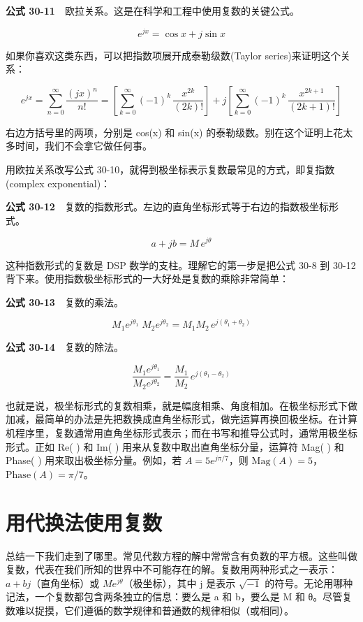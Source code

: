 \textbf{公式 30-11}　欧拉关系。这是在科学和工程中使用复数的关键公式。

\[e^{jx} = \cos x + j\sin x\]

如果你喜欢这类东西，可以把指数项展开成泰勒级数(Taylor
series)来证明这个关系：

\[e^{jx} = \sum_{n=0}^{\infty}\frac{(jx)^n}{n!} = \left[\sum_{k=0}^{\infty}(-1)^k\,\frac{x^{2k}}{(2k)!}\right] + j\left[\sum_{k=0}^{\infty}(-1)^k\,\frac{x^{2k+1}}{(2k+1)!}\right]\]

右边方括号里的两项，分别是 cos(x) 和 sin(x)
的泰勒级数。别在这个证明上花太多时间，我们不会拿它做任何事。

用欧拉关系改写公式
30-10，就得到极坐标表示复数最常见的方式，即复指数(complex exponential)：

\textbf{公式
30-12}　复数的指数形式。左边的直角坐标形式等于右边的指数极坐标形式。

\[a + jb = M\,e^{j\theta}\]

这种指数形式的复数是 DSP 数学的支柱。理解它的第一步是把公式 30-8 到
30-12 背下来。使用指数极坐标形式的一大好处是复数的乘除非常简单：

\textbf{公式 30-13}　复数的乘法。

\[M_1 e^{j\theta_1}\; M_2 e^{j\theta_2} = M_1 M_2\, e^{j(\theta_1+\theta_2)}\]

\textbf{公式 30-14}　复数的除法。

\[\frac{M_1 e^{j\theta_1}}{M_2 e^{j\theta_2}} = \frac{M_1}{M_2}\, e^{j(\theta_1-\theta_2)}\]

也就是说，极坐标形式的复数相乘，就是幅度相乘、角度相加。在极坐标形式下做加减，最简单的办法是先把数换成直角坐标形式，做完运算再换回极坐标。在计算机程序里，复数通常用直角坐标形式表示；而在书写和推导公式时，通常用极坐标形式。正如
Re( ) 和 Im( ) 用来从复数中取出直角坐标分量，运算符 Mag( ) 和 Phase( )
用来取出极坐标分量。例如，若 \(A = 5e^{j\pi/7}\)，则
\(\mathrm{Mag}(A) = 5\)，\(\mathrm{Phase}(A) = \pi/7\)。

\section{用代换法使用复数}

总结一下我们走到了哪里。常见代数方程的解中常常含有负数的平方根。这些叫做复数，代表在我们所知的世界中不可能存在的解。复数用两种形式之一表示：\(a+bj\)（直角坐标）或
\(Me^{j\theta}\)（极坐标），其中 j 是表示 \(\sqrt{-1}\)
的符号。无论用哪种记法，一个复数都包含两条独立的信息：要么是 a 和
b，要么是 M 和
θ。尽管复数难以捉摸，它们遵循的数学规律和普通数的规律相似（或相同）。

